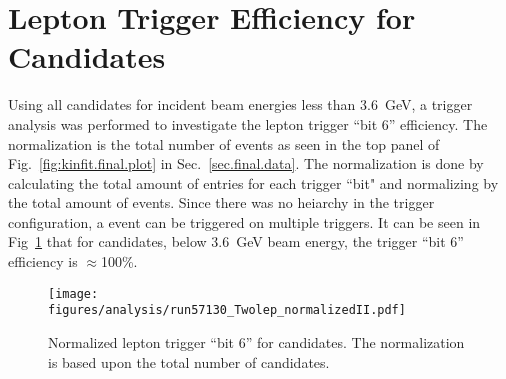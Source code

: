 \section{Lepton Trigger Efficiency for \piz Candidates}\label{sec:analysis.trigger.verify}
Using all \piz candidates for incident beam energies less than 3.6~GeV, a trigger analysis was performed to investigate the lepton trigger ``bit 6'' efficiency. The normalization is the total number of \piz events as seen in the top panel of Fig.~\ref{fig:kinfit.final.plot} in Sec.~\ref{sec.final.data}. The normalization is done by calculating the total amount of entries for each trigger ``bit" and normalizing by the total amount of events. Since there was no heiarchy in the trigger configuration, a event can be triggered on multiple triggers. It can be seen in Fig~\ref{fig:Leptrigger} that for \piz candidates, below 3.6~GeV beam energy, the trigger ``bit 6'' efficiency is $\approx$100\%.

\begin{figure}[h!]\begin{center}
\texttt{[image: \\figures/analysis/run57130\_Twolep\_normalizedII.pdf]}
\caption[Normalized Lepton Trigger ``Bit 6'' for \piz candidates]{\label{fig:Leptrigger}Normalized lepton trigger ``bit 6'' for \piz candidates. The normalization is based upon the total number of \piz candidates.}
\end{center}\end{figure} 